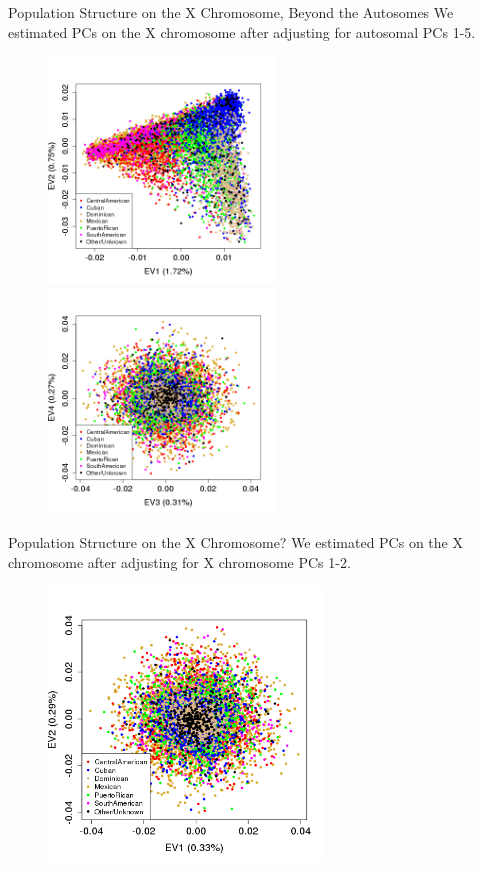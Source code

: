 \documentclass{beamer}
\begin{document}
\begin{frame}{Population Structure on the X Chromosome, Beyond the Autosomes}
We estimated PCs on the X chromosome after adjusting for autosomal PCs 1-5.\\ 
\begin{figure}
\centering
\includegraphics[height=6cm]{../eigen_unrel_adjXkc_adjAutoPC15_xPrunedKC_ev12_col.png}
\includegraphics[height=6cm]{../eigen_unrel_adjXkc_adjAutoPC15_xPrunedKC_ev34_col.png}
\end{figure}
\end{frame}

\begin{frame}{Population Structure on the X Chromosome?}
We estimated PCs on the X chromosome after adjusting for X chromosome PCs 1-2.
\begin{figure}
\centering
\includegraphics[height=7.3cm]{../eigen_unrel_adjxPrunedKC_adjxPC12_ev12_col.png}
\end{figure}
\end{frame}
\end{document}
